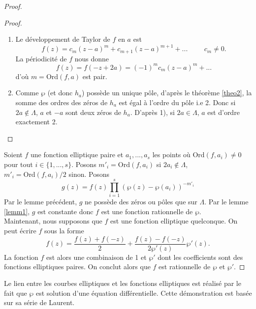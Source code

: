 \documentclass[a4paper]{article}
\begin{document}
\begin{proof}
\begin{proof}
\begin{enumerate}
\item
Le développement de Taylor de $f$ en $a$ est
\begin{equation*}
f(z)=c_m(z-a)^m+c_{m+1}(z-a)^{m+1}+... \hspace{1cm}c_m \neq 0.
\end{equation*}
La périodicité de $f$ nous donne
\begin{equation*}
f(z)=f(-z+2a)=(-1)^mc_m(z-a)^m+...
\end{equation*}
d'où $m=\text{Ord}(f,a)$ est pair.
\item Comme $\wp$ (et donc $h_a$) possède un unique pôle, d'après le théorème \ref{theo2}, la somme des ordres des zéros de $h_a$ est égal à l'ordre du pôle i.e 2. Donc si $2a \not \in \Lambda$, $a$ et $-a$ sont deux zéros  de $h_a$. D'après 1), si $2a \in \Lambda$, $a$ est d'ordre exactement 2.
\end{enumerate}
\end{proof}
Soient $f$ une fonction elliptique paire et $a_1,...,a_s$ les points où $\text{Ord}(f,a_i) \neq 0$ pour tout $i\in \{1,...,s\}$. Posons $m'_i=\text{Ord}(f,a_i)$ si $2a_i \not \in \Lambda$, $m'_i=\text{Ord}(f,a_i)/2$ sinon. Posons 
\begin{equation*}
g(z)=f(z) \prod \limits_{i=1}^s(\wp(z)-\wp(a_i))^{-m'_i}
\end{equation*}
Par le lemme précédent, $g$ ne possède des zéros ou pôles que sur $\Lambda$. Par le lemme \ref{lemm1}, $g$ est constante donc $f$ est une fonction rationnelle de $\wp$. \\
Maintenant, nous supposons que $f$ est une fonction elliptique quelconque. On peut écrire $f$ sous la forme
\begin{equation*}
f(z)=\frac{f(z)+f(-z)}{2}+\frac{f(z)-f(-z)}{2\wp'(z)}\wp'(z).
\end{equation*}
La fonction $f$ est alors une combinaison de 1 et $\wp'$ dont les coefficients sont des fonctions elliptiques paires. On conclut alors que $f$ est rationnelle de $\wp$ et $\wp'$.

\end{proof}


\noindent Le lien entre les courbes elliptiques et les fonctions elliptiques est réalisé par le fait que $\wp$ est solution d'une équation différentielle. Cette démonstration est basée sur sa série de Laurent.
\end{document}
